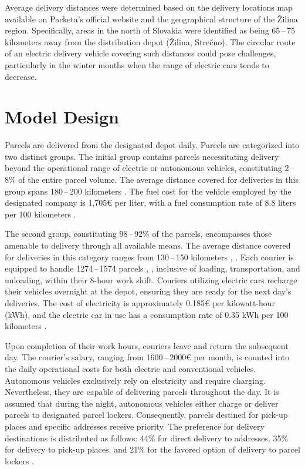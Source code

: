 \documentclass[a4paper, 11pt, a4paper]{article}
\begin{document}
Average delivery distances were determined based on the delivery locations map available on Packeta's official website \cite{packeta} and the geographical
structure of the Žilina region. Specifically, areas in the north of Slovakia were identified as being 65\,--\,75 kilometers away from the
distribution depot (Žilina, Strečno). The circular route of an electric delivery vehicle covering such distances could pose challenges,
particularly in the winter months when the range of electric cars tends to decrease.


\section{Model Design}

Parcels are delivered from the designated depot daily. Parcels are categorized into two distinct groups. The initial group contains parcels
necessitating delivery beyond the operational range of electric or autonomous vehicles, constituting 2\,--\,8\% \cite{packeta} of the entire parcel volume.
The average distance covered for deliveries in this group spans 180\,--\,200 kilometers \cite{packeta}. The fuel cost for the vehicle employed by the designated
company is 1,705€ per liter, with a fuel consumption rate of 8.8 liters per 100 kilometers \cite{peugeot}.

The second group, constituting 98\,--\,92\% \cite{packeta} of the parcels, encompasses those amenable to delivery through all available means. The average distance
covered for deliveries in this category ranges from 130\,--\,150 kilometers \cite{packeta}, \cite{delivery.distance}. Each courier is equipped to handle 1274\,--\,1574 parcels \cite{parcels.num}, \cite{delivery.percentage}, inclusive of loading,
transportation, and unloading, within their 8-hour work shift. Couriers utilizing electric cars recharge their vehicles overnight at the depot, ensuring
they are ready for the next day's deliveries. The cost of electricity is approximately 0.185€ per kilowatt-hour (kWh), and the electric car in use has a
consumption rate of 0.35 kWh per 100 kilometers \cite{peugeot}.

Upon completion of their work hours, couriers leave and return the subsequent day. The courier's salary, ranging from 1600\,--\,2000€ per month, is counted into
the daily operational costs for both electric and conventional vehicles. Autonomous vehicles exclusively rely on electricity and require charging.
Nevertheless, they are capable of delivering parcels throughout the day. It is assumed that during the night, autonomous vehicles either
charge or deliver parcels to designated parcel lockers. Consequently, parcels destined for pick-up places and specific addresses receive priority.
The preference for delivery destinations is distributed as follows: 44\% for direct delivery to addresses, 35\% for delivery to pick-up places,
and 21\% for the favored option of delivery to parcel lockers \cite{delivery.percentage}.
\end{document}
